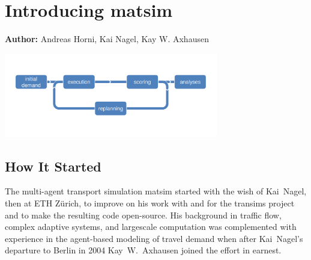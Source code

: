\chapter{Introducing \protect\gls{matsim}}
\label{ch:introducing}
\hfill \textbf{Author:} Andreas Horni, Kai Nagel, Kay W. Axhausen

\begin{center} \includegraphics[width=0.7\textwidth, angle=0]{figures/matsimcycle.pdf} \end{center}



\section{How It Started}
\label{sec:howitstarted}
The multi-\gls{agent} transport simulation \gls{matsim} \citep[][]{MATSIM_Webpage_2015} started with the wish of Kai~Nagel, then at ETH Zürich, to improve on his work with and for the \gls{transims} project \citep[][]{SmithEtAl_NTRPAC_1995} and to make the resulting code open-source. His background in traffic flow, complex adaptive systems, and \gls{largescale} computation was complemented with experience in the agent-based modeling of travel demand when after Kai~Nagel's departure to Berlin in 2004 Kay~W.~Axhausen joined the effort in earnest. 

